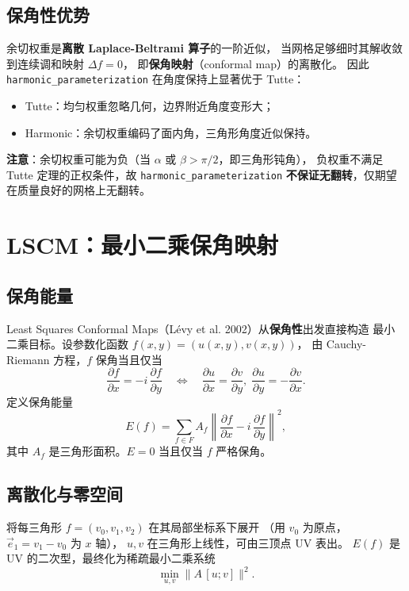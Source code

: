 \documentclass[11pt,a4paper]{article}
\begin{document}
\subsection{保角性优势}

余切权重是\textbf{离散 Laplace-Beltrami 算子}的一阶近似，
当网格足够细时其解收敛到连续调和映射 $\Delta f = 0$，
即\textbf{保角映射}（conformal map）的离散化。
因此 \texttt{harmonic\_parameterization} 在角度保持上显著优于 Tutte：
\begin{itemize}
  \item Tutte：均匀权重忽略几何，边界附近角度变形大；
  \item Harmonic：余切权重编码了面内角，三角形角度近似保持。
\end{itemize}

\textbf{注意}：余切权重可能为负（当 $\alpha$ 或 $\beta > \pi/2$，即三角形钝角），
负权重不满足 Tutte 定理的正权条件，故 \texttt{harmonic\_parameterization}
\textbf{不保证无翻转}，仅期望在质量良好的网格上无翻转。

\section{LSCM：最小二乘保角映射}

\subsection{保角能量}

Least Squares Conformal Maps（Lévy et al. 2002）从\textbf{保角性}出发直接构造
最小二乘目标。设参数化函数 $f(x, y) = (u(x, y), v(x, y))$，
由 Cauchy-Riemann 方程，$f$ 保角当且仅当
\[
  \frac{\partial f}{\partial x} = -i\,\frac{\partial f}{\partial y}
  \quad\Longleftrightarrow\quad
  \frac{\partial u}{\partial x} = \frac{\partial v}{\partial y},\;
  \frac{\partial u}{\partial y} = -\frac{\partial v}{\partial x}.
\]
定义保角能量
\[
  E(f) = \sum_{f \in F} A_f \left\|
    \frac{\partial f}{\partial x} - i\,\frac{\partial f}{\partial y}
  \right\|^2,
\]
其中 $A_f$ 是三角形面积。$E = 0$ 当且仅当 $f$ 严格保角。

\subsection{离散化与零空间}

将每三角形 $f = (v_0, v_1, v_2)$ 在其局部坐标系下展开
（用 $v_0$ 为原点，$\vec{e}_1 = v_1 - v_0$ 为 $x$ 轴），
$u, v$ 在三角形上线性，可由三顶点 UV 表出。
$E(f)$ 是 UV 的二次型，最终化为稀疏最小二乘系统
\[
  \min_{u, v} \bigl\| A \, [u; v] \bigr\|^2.
\]
\end{document}
